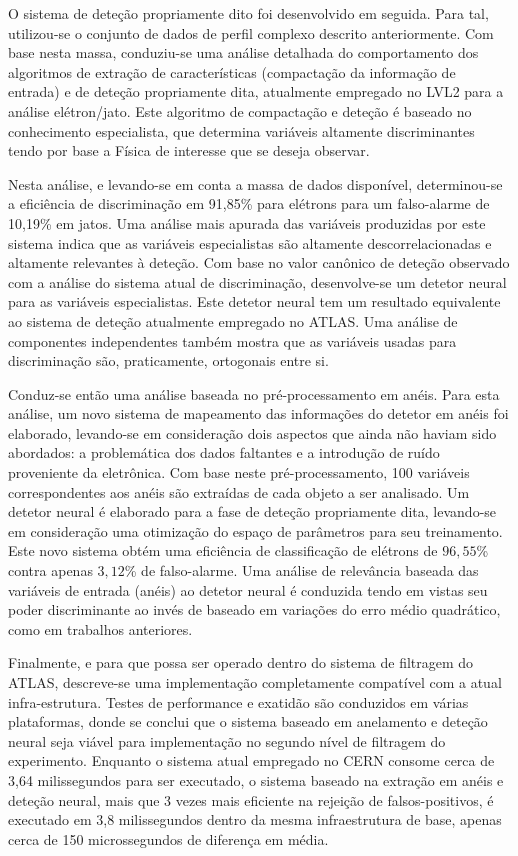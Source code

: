 O sistema de deteção propriamente dito foi desenvolvido em seguida. Para tal,
utilizou-se o conjunto de dados de perfil complexo descrito anteriormente. Com
base nesta massa, conduziu-se uma análise detalhada do comportamento dos
algoritmos de extração de características (compactação da informação de
entrada) e de deteção propriamente dita, atualmente empregado no LVL2 para a
análise elétron/jato. Este algoritmo de compactação e deteção é baseado no
conhecimento especialista, que determina variáveis altamente discriminantes
tendo por base a Física de interesse que se deseja observar.

Nesta análise, e levando-se em conta a massa de dados disponível,
determinou-se a eficiência de discriminação em 91,85\% para elétrons para um
falso-alarme de 10,19\% em jatos. Uma análise mais apurada das variáveis
produzidas por este sistema indica que as variáveis especialistas são
altamente descorrelacionadas e altamente relevantes à deteção. Com base no
valor canônico de deteção observado com a análise do sistema atual de
discriminação, desenvolve-se um detetor neural para as variáveis
especialistas. Este detetor neural tem um resultado equivalente ao sistema de
deteção atualmente empregado no ATLAS. Uma análise de componentes
independentes também mostra que as variáveis usadas para discriminação são,
praticamente, ortogonais entre si.

Conduz-se então uma análise baseada no pré-processamento em anéis. Para esta
análise, um novo sistema de mapeamento das informações do detetor em anéis foi
elaborado, levando-se em consideração dois aspectos que ainda não haviam sido
abordados: a problemática dos dados faltantes e a introdução de ruído
proveniente da eletrônica. Com base neste pré-processamento, 100 variáveis
correspondentes aos anéis são extraídas de cada objeto a ser analisado. Um
detetor neural é elaborado para a fase de deteção propriamente dita,
levando-se em consideração uma otimização do espaço de parâmetros para seu
treinamento. Este novo sistema obtém uma eficiência de classificação de
elétrons de $96,55$\% contra apenas $3,12$\% de falso-alarme. Uma análise de
relevância baseada das variáveis de entrada (anéis) ao detetor neural é
conduzida tendo em vistas seu poder discriminante ao invés de baseado em
variações do erro médio quadrático, como em trabalhos anteriores.

Finalmente, e para que possa ser operado dentro do sistema de filtragem do
ATLAS, descreve-se uma implementação completamente compatível com a atual
infra-estrutura. Testes de performance e exatidão são conduzidos em várias
plataformas, donde se conclui que o sistema baseado em anelamento e deteção
neural seja viável para implementação no segundo nível de filtragem do
experimento. Enquanto o sistema atual empregado no CERN consome cerca de 3,64
milissegundos para ser executado, o sistema baseado na extração em anéis e
deteção neural, mais que 3 vezes mais eficiente na rejeição de
falsos-positivos, é executado em 3,8 milissegundos dentro da mesma
infraestrutura de base, apenas cerca de 150 microssegundos de diferença em
média.

